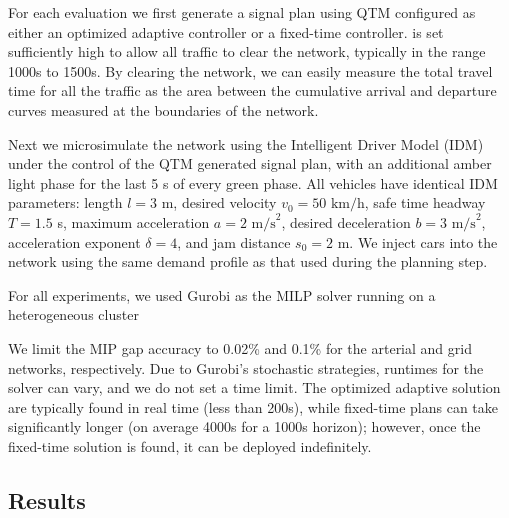 For each evaluation we first generate a signal plan using QTM configured as either an optimized adaptive controller or a fixed-time controller. \TMAX is set sufficiently high to allow all traffic to clear the network,
typically in the range 1000s to 1500s.
%
By clearing the network, we can easily measure the total travel time for all the
traffic as the area between the cumulative arrival and departure curves measured
at the boundaries of the network.
%
%
%

Next we microsimulate the network using the Intelligent Driver Model (IDM) \cite{treiber2000congested} under the control of the QTM generated signal plan, with an additional amber light phase for the last 5 s of every green phase.  All vehicles have identical IDM parameters: length $l=3$ m, desired velocity $v_0 = 50 \text{ km/h}$, safe time headway $T=1.5$ s, maximum acceleration
$a=2 \text{ m/s}^2$, desired deceleration $b = 3 \text{ m/s}^2$, acceleration exponent $\delta = 4$, and jam distance $s_0 = 2$ m.
We inject cars into the network using the same demand profile as that used during the planning step.


For all experiments, we used Gurobi as the MILP solver running on a
heterogeneous cluster 

We limit the MIP gap accuracy to 0.02\% and 0.1\% for the arterial and grid
networks, respectively.
%
Due to Gurobi's stochastic strategies, runtimes for the solver can vary, and we
do not set a time limit.
%
The optimized adaptive solution are typically found in real time (less than
200s), while fixed-time plans can take significantly longer (on average 4000s
for a 1000s horizon); however, once the fixed-time solution is found, it can be
deployed indefinitely.




\subsection{Results}


